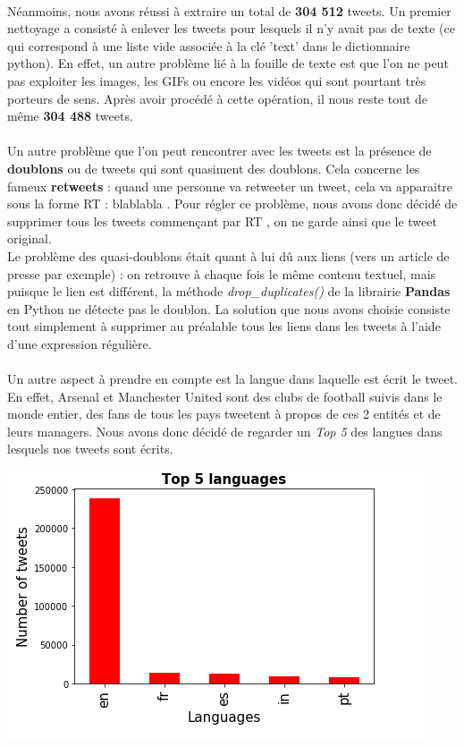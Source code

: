 \documentclass[14pt, openany]{article}
\begin{document}
\paragraph{}
Néanmoins, nous avons réussi à extraire un total de \textbf{304 512} tweets. Un premier nettoyage a consisté à enlever les tweets pour lesquels il n'y avait pas de texte (ce qui correspond à une liste vide associée à la clé 'text' dans le dictionnaire python). En effet, un autre problème lié à la fouille de texte est que l'on ne peut pas exploiter les images, les GIFs ou encore les vidéos qui sont pourtant très porteurs de sens. Après avoir procédé à cette opération, il nous reste tout de même \textbf{304 488} tweets.
\paragraph{}
Un autre problème que l'on peut rencontrer avec les tweets est la présence de \textbf{doublons} ou de tweets qui sont quasiment des doublons. Cela concerne les fameux \textbf{retweets} : quand une personne va retweeter un tweet, cela va apparaitre sous la forme \og RT : blablabla \fg{}. Pour régler ce problème, nous avons donc décidé de supprimer tous les tweets commençant par \og RT \fg{}, on ne garde ainsi que le tweet original.\\
Le problème des \og quasi-doublons \fg{} était quant à lui dû aux liens (vers un article de presse par exemple) : on retrouve à chaque fois le même contenu textuel, mais puisque le lien est différent, la méthode \textit{drop\_duplicates()} de la librairie \textbf{Pandas} en Python ne détecte pas le doublon. La solution que nous avons choisie consiste tout simplement à supprimer au préalable tous les liens dans les tweets à l'aide d'une expression régulière.
\paragraph{}
Un autre aspect à prendre en compte est la langue dans laquelle est écrit le tweet. En effet, Arsenal et Manchester United sont des clubs de football suivis dans le monde entier, des fans de tous les pays tweetent à propos de ces 2 entités et de leurs managers. Nous avons donc décidé de regarder un \textit{Top 5} des langues dans lesquels nos tweets sont écrits.\\
\begin{center}
\includegraphics[scale=0.8]{Images/top5.jpg}
\end{center}
\end{document}
